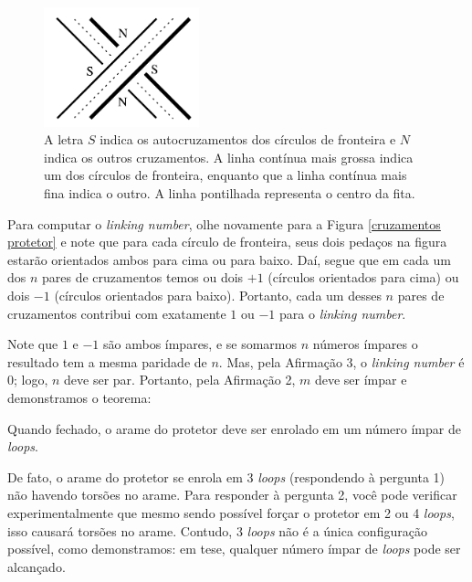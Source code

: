 	\begin{figure}[H]
		\begin{center}
			\includegraphics[width=4.5cm]{Images/protetor_fechado.png}
		\end{center}\caption{A letra $S$ indica os autocruzamentos dos círculos de fronteira e $N$ indica os outros cruzamentos. A linha contínua mais grossa indica um dos círculos de fronteira, enquanto que a linha contínua mais fina indica o outro. A linha pontilhada representa o centro da fita.}\label{cruzamentos protetor}
	\end{figure}
	\par\vspace{0.3cm} Para computar o \textit{linking number}, olhe novamente para a Figura \eqref{cruzamentos protetor} e note que para cada círculo de fronteira, seus dois pedaços na figura estarão orientados ambos para cima ou para baixo. Daí, segue que em cada um dos $n$ pares de cruzamentos temos ou dois $+1$ (círculos orientados para cima) ou dois $-1$ (círculos orientados para baixo). Portanto, cada um desses $n$ pares de cruzamentos contribui com exatamente $1$ ou $-1$ para o \textit{linking number}.
	\par\vspace{0.3cm} Note que $1$ e $-1$ são ambos ímpares, e se somarmos $n$ números ímpares o resultado tem a mesma paridade de $n$. Mas, pela Afirmação 3, o \textit{linking number} é $0$; logo, $n$ deve ser par. Portanto, pela Afirmação 2, $m$ deve ser ímpar e demonstramos o teorema:
	\begin{theorem}
		\label{teorema protetor de para-brisa}
		Quando fechado, o arame do protetor deve ser enrolado em um número ímpar de \textit{loops}.
	\end{theorem}  
	\par\vspace{0.3cm} De fato, o arame do protetor se enrola em 3 \textit{loops} (respondendo à pergunta 1) não havendo torsões no arame. Para responder à pergunta 2, você pode verificar experimentalmente que mesmo sendo possível forçar o protetor em 2 ou 4 \textit{loops}, isso causará torsões no arame. Contudo, $3$ \textit{loops} não é a única configuração possível, como demonstramos: em tese, qualquer número ímpar de \textit{loops} pode ser alcançado.